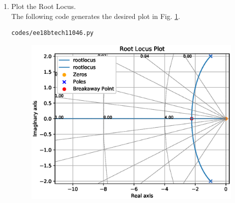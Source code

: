 \begin{enumerate}[label=\thesubsection.\arabic*.,ref=\thesubsection.\theenumi]
\begin{itemize}
\end{itemize}
    
\item Plot the Root Locus.
\\
\solution The following code generates the desired plot in Fig. \ref{fig:ee18btech11046}.
\begin{lstlisting}
codes/ee18btech11046.py
\end{lstlisting}    


\begin{figure}[ht!]
\centering
    \includegraphics[width=\columnwidth]{./figs/ee18btech11046.eps}
    \caption{}
    \label{fig:ee18btech11046}
\end{figure}


\end{enumerate}

